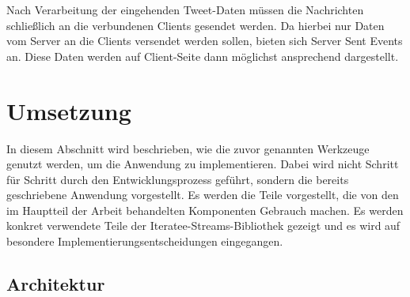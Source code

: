 Nach Verarbeitung der eingehenden Tweet-Daten müssen die Nachrichten schließlich an die verbundenen Clients gesendet werden.
Da hierbei nur Daten vom Server an die Clients versendet werden sollen, bieten sich Server Sent Events an.
Diese Daten werden auf Client-Seite dann möglichst ansprechend dargestellt.


\section{Umsetzung} %
\label{sec:umsetzung}

In diesem Abschnitt wird beschrieben, wie die zuvor genannten Werkzeuge genutzt werden, um die Anwendung zu implementieren.
Dabei wird nicht Schritt für Schritt durch den Entwicklungsprozess geführt, sondern die bereits geschriebene Anwendung vorgestellt.
Es werden die Teile vorgestellt, die  von den im Hauptteil der Arbeit behandelten Komponenten Gebrauch machen.
Es werden konkret verwendete Teile der Iteratee-Streams-Bibliothek gezeigt und es wird auf besondere Implementierungsentscheidungen eingegangen.

\subsection{Architektur} %
\label{sub:architektur_twitter_news}

